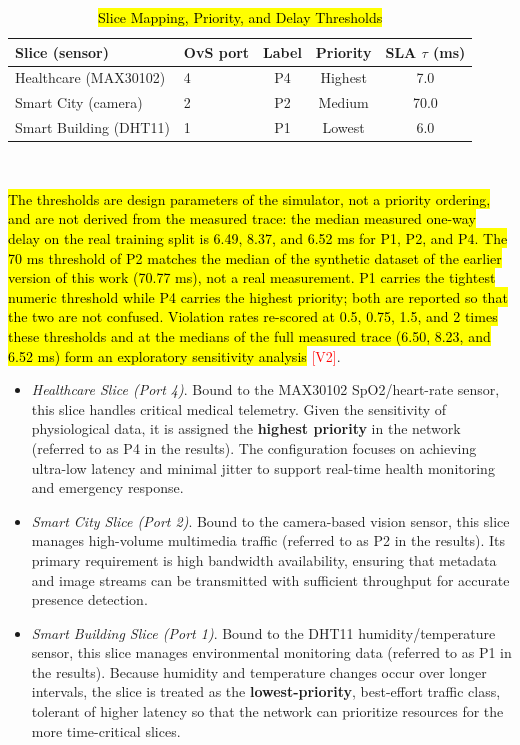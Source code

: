\documentclass[conference]{IEEEtran}
\newcommand{\rev}[1]{\hl{#1}}
\newcommand{\m}[1]{\mbox{$#1$}}
\newcommand{\revhdr}{\rowcolor{yellow!45}}
\begin{document}
\begin{table}[htbp]
\centering
\caption{\rev{Slice Mapping, Priority, and Delay Thresholds}}
\label{tab:slices}
\footnotesize
\begin{tabular}{llccc}
\toprule
\revhdr Slice (sensor) & OvS port & Label & Priority & SLA \m{\tau} (ms) \\
\midrule
Healthcare (MAX30102) & 4 & P4 & Highest & 7.0 \\
Smart City (camera)   & 2 & P2 & Medium  & 70.0 \\
Smart Building (DHT11)& 1 & P1 & Lowest  & 6.0 \\
\bottomrule
\end{tabular}
\\[3pt]
\parbox{\columnwidth}{\footnotesize \rev{The thresholds are design parameters of the simulator, not a priority ordering, and are not derived from the measured trace: the median measured one-way delay on the real training split is 6.49, 8.37, and 6.52 ms for P1, P2, and P4. The 70 ms threshold of P2 matches the median of the synthetic dataset of the earlier version of this work (70.77 ms), not a real measurement. P1 carries the tightest numeric threshold while P4 carries the highest priority; both are reported so that the two are not confused. Violation rates re-scored at 0.5, 0.75, 1.5, and 2 times these thresholds and at the medians of the full measured trace (6.50, 8.23, and 6.52 ms) form an exploratory sensitivity analysis} \textcolor{red}{[V2]}.}
\end{table}

\begin{itemize}
\item
  \emph{Healthcare Slice (Port 4)}. Bound to the MAX30102 SpO2/heart-rate sensor, this slice handles critical medical telemetry. Given the sensitivity of physiological data, it is assigned the \textbf{highest priority} in the network (referred to as P4 in the results). The configuration focuses on achieving ultra-low latency and minimal jitter to support real-time health monitoring and emergency response.
\item
  \emph{Smart City Slice (Port 2)}. Bound to the camera-based vision sensor, this slice manages high-volume multimedia traffic (referred to as P2 in the results). Its primary requirement is high bandwidth availability, ensuring that metadata and image streams can be transmitted with sufficient throughput for accurate presence detection.
\item
  \emph{Smart Building Slice (Port 1)}. Bound to the DHT11 humidity/temperature sensor, this slice manages environmental monitoring data (referred to as P1 in the results). Because humidity and temperature changes occur over longer intervals, the slice is treated as the \textbf{lowest-priority}, best-effort traffic class, tolerant of higher latency so that the network can prioritize resources for the more time-critical slices.
\end{itemize}
\end{document}
